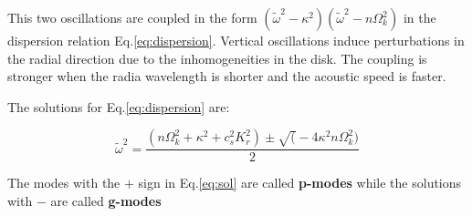 \documentclass[12pt]{article}
\begin{document}
This two oscillations are coupled in the form $(\tilde{\omega}^2 -
\kappa^2)(\tilde{\omega}^2 - n\Omega_k^2)$ in the dispersion relation
Eq.\ref{eq:dispersion}. Vertical oscillations induce perturbations
in the radial direction due to the inhomogeneities in the disk. The
coupling is stronger when the radia wavelength is shorter and the
acoustic speed is faster.

The solutions for Eq.\ref{eq:dispersion} are:

\begin{equation}\label{eq:sol}
\tilde{\omega}^2 = \dfrac{(n\Omega_k^2 + \kappa^2 + c_s^2 K_r^2) \pm
\sqrt( - 4\kappa^2n\Omega_k^2)}{2}
\end{equation}

The modes with the $+$ sign in Eq.\ref{eq:sol} are called
\textbf{p-modes} while the solutions with $-$ are called
\textbf{g-modes}
\end{document}
